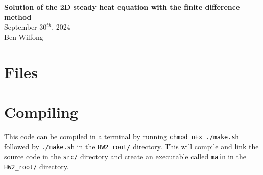 \documentclass[reqno, 12pt]{amsart}
\def\name{Ben Wilfong} %
\def\ID{bwilfong3} %
\begin{document}
	\noindent
	\thispagestyle{firststyle}

    \begin{center}
        \LARGE{\textbf{Solution of the 2D steady heat equation with the finite difference method}} \\
        \Large{September 30$^{th}$, 2024} \\
        \large{Ben Wilfong}
    \end{center}
    \section*{Files}
    \section*{Compiling}
    \noindent This code can be compiled in a terminal by running \texttt{chmod u+x ./make.sh} followed by \texttt{./make.sh} in the \texttt{HW2\_root/} directory.
    This will compile and link the source code in the \texttt{src/} directory and create an executable called \texttt{main} in the \texttt{HW2\_root/} directory.
\end{document}
